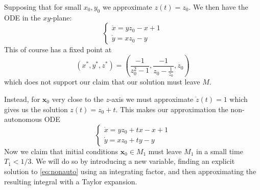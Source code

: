 \documentclass[11pt]{article}
\begin{document}
Supposing that for small $x_0, y_0$ we approximate $z(t) = z_0$. We then have the ODE in the $xy$-plane:
\begin{equation*}
    \begin{cases}
        \displaystyle
        \dot{x} = yz_0 - x + 1\\

        \displaystyle
        \dot{y} = xz_0 - y
    \end{cases}
\end{equation*}
This of course has a fixed point at $$(x^*, y^*, z^*) = \left( \frac{-1}{z_0^2 - 1}, \frac{-1}{z_0-\frac{1}{z_0}}, z_0 \right)$$which does not support our claim that our solution must leave $M$. 

Instead, for $\mathbf{x}_0$ very close to the $z$-axis we must approximate $\dot{z}(t) = 1 $ which gives us the solution $z(t) = z_0 + t$. This makes our approximation the non-autonomous ODE
\begin{equation}\label{eq:nonauto}
\begin{cases}
    \displaystyle
    \dot{x} = yz_0 + tx - x + 1\\

    \displaystyle
    \dot{y} = xz_0 + ty - y
\end{cases}
\end{equation}
Now we claim that initial conditions $\mathbf{x}_0 \in M_1$ must leave $M_1$ in a small time $T_1 < 1/3$. We will do so by introducing a new variable, finding an explicit solution to \eqref{eq:nonauto} using an integrating factor, and then approximating the resulting integral with a Taylor expansion. 
\end{document}
